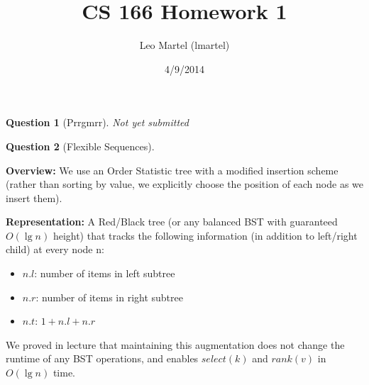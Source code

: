 \documentclass{article}
\title{CS 166 Homework 1}
\author{Leo Martel (lmartel)}
\date{4/9/2014}
\newtheorem{ques}{Question}
\renewcommand{\b}[1]{\textbf{#1}}
\begin{document}
\maketitle

\begin{ques}[Prrgmrr] 
Not yet submitted
\end{ques}

\begin{ques}[Flexible Sequences] %
\end{ques}
\b{Overview:} We use an Order Statistic tree with a modified insertion scheme (rather than sorting by value, we explicitly choose the position of each node as we insert them).

\b{Representation:} A Red/Black tree (or any balanced BST with guaranteed $O(\lg n)$ height) that tracks the following information (in addition to left/right child) at every node n:
\begin{itemize}
  \item $n.l$: number of items in left subtree
  \item $n.r$: number of items in right subtree
  \item $n.t$: $1 + n.l + n.r$
\end{itemize}
We proved in lecture that maintaining this augmentation does not change the runtime of any BST operations, and enables $select(k)$ and $rank(v)$ in $O(\lg n)$ time.
\end{document}
